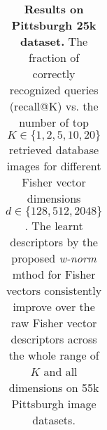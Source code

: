 \begin{table}[t!]
\begin{centering}
\begin{tabularx}{0.89\linewidth}{|l|c c c c c|}
	\end{tabularx}
	\caption{ 
    \textbf{Results on Pittsburgh 25k dataset.} The fraction of correctly recognized queries (recall@K) vs. the number of top $K\in\{1,2,5,10,20\}$ retrieved database images for different Fisher vector dimensions $d\in\{128,512,2048\}$. The learnt descriptors by the proposed \emph{w-norm} mthod for Fisher vectors consistently improve over the raw Fisher vector descriptors across the whole range of $K$ and all dimensions on 55k Pittsburgh image datasets.		
  }
\label{tab:recall02}
\end{centering}
\end{table}
